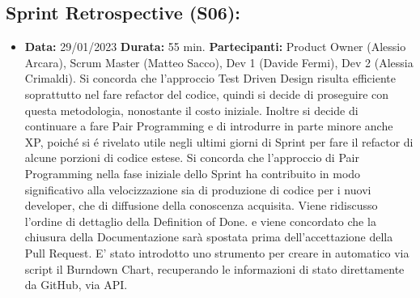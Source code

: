 \documentclass[a4paper, oneside]{article}
\newcommand\tre{Scrum Master (Matteo Sacco), Dev 1 (Davide Fermi), Dev 2 (Alessia Crimaldi).}
\newcommand\treP{Product Owner (Alessio Arcara), }
\begin{document}
\begin{landscape}
\begin{itemize}
        \end{itemize}

        \newpage
        \subsection{Sprint Retrospective (S06):}
        \begin{itemize}
            \item \textbf{Data:} 29/01/2023
            \newline \textbf{Durata:} 55 min.
            \newline \textbf{Partecipanti:} \treP \tre
            \newline
            \newline Si concorda che l'approccio Test Driven Design risulta efficiente soprattutto nel fare refactor del codice, quindi si decide di proseguire con questa metodologia, nonostante il costo iniziale. Inoltre si decide di continuare a fare Pair Programming e di introdurre in parte minore anche XP, poich\'e si \'e rivelato utile negli ultimi giorni di Sprint per fare il refactor di alcune porzioni di codice estese.
            \newline Si concorda che l'approccio di Pair Programming nella fase iniziale dello Sprint ha contribuito in modo significativo alla velocizzazione sia di produzione di codice per i nuovi developer, che di diffusione della conoscenza acquisita.
            \newline Viene ridiscusso l'ordine di dettaglio della Definition of Done. e viene concordato che la chiusura della Documentazione sarà spostata prima dell'accettazione della Pull Request. E' stato introdotto uno strumento per creare in automatico via script il Burndown Chart, recuperando le informazioni di stato direttamente da GitHub, via API.
        \end{itemize}

        \newpage

\end{landscape}
\end{document}
